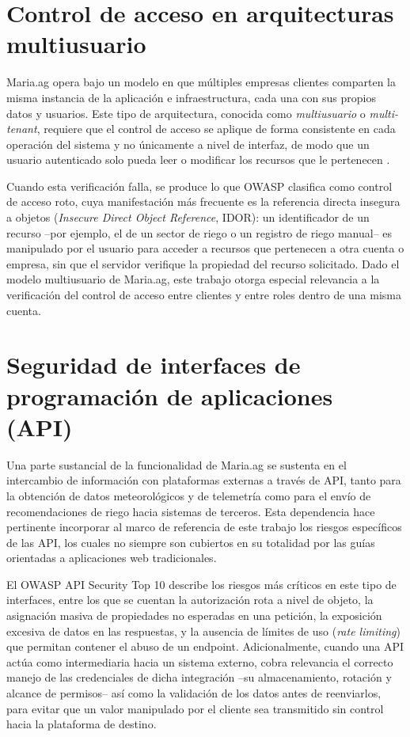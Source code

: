 \documentclass[12pt,letterpaper]{report}
\begin{document}
\section*{Control de acceso en arquitecturas multiusuario}

Maria.ag opera bajo un modelo en que múltiples empresas clientes comparten la
misma instancia de la aplicación e infraestructura, cada una con sus propios
datos y usuarios. Este tipo de arquitectura, conocida como
\textit{multiusuario} o \textit{multi-tenant}, requiere que el control de
acceso se aplique de forma consistente en cada operación del sistema y no
únicamente a nivel de interfaz, de modo que un usuario autenticado solo pueda
leer o modificar los recursos que le pertenecen \autocite{owasp2025top10}.

Cuando esta verificación falla, se produce lo que OWASP clasifica como
control de acceso roto, cuya manifestación más frecuente es la referencia
directa insegura a objetos (\textit{Insecure Direct Object Reference}, IDOR):
un identificador de un recurso --por ejemplo, el de un sector de riego o un
registro de riego manual-- es manipulado por el usuario para acceder a
recursos que pertenecen a otra cuenta o empresa, sin que el servidor verifique
la propiedad del recurso solicitado. Dado el modelo multiusuario de Maria.ag,
este trabajo otorga especial relevancia a la verificación del control de
acceso entre clientes y entre roles dentro de una misma cuenta.

\section*{Seguridad de interfaces de programación de aplicaciones (API)}

Una parte sustancial de la funcionalidad de Maria.ag se sustenta en el
intercambio de información con plataformas externas a través de API, tanto
para la obtención de datos meteorológicos y de telemetría como para el envío
de recomendaciones de riego hacia sistemas de terceros. Esta dependencia hace
pertinente incorporar al marco de referencia de este trabajo los riesgos
específicos de las API, los cuales no siempre son cubiertos en su totalidad
por las guías orientadas a aplicaciones web tradicionales.

El OWASP API Security Top 10 \autocite{owasp2023api} describe los riesgos más críticos en este tipo
de interfaces, entre los que se cuentan la autorización rota a nivel de
objeto, la asignación masiva de propiedades no esperadas en una petición, la
exposición excesiva de datos en las respuestas, y la ausencia de límites de
uso (\textit{rate limiting}) que permitan contener el abuso de un endpoint.
Adicionalmente, cuando una API actúa como intermediaria hacia un sistema
externo, cobra relevancia el correcto manejo de las credenciales de dicha
integración --su almacenamiento, rotación y alcance de permisos-- así como la
validación de los datos antes de reenviarlos, para evitar que un valor
manipulado por el cliente sea transmitido sin control hacia la plataforma de
destino.
\end{document}
